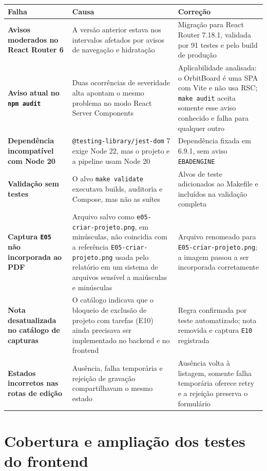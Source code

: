\documentclass[12pt,a4paper,openany]{report}
\begin{document}
\begin{longtable}{>{\bfseries}p{} p{} p{}}
\toprule
Falha & Causa & Correção \\
\midrule
\endhead
Avisos moderados no React Router 6 & A versão anterior estava nos intervalos afetados por avisos de navegação e hidratação & Migração para React Router 7.18.1, validada por 91 testes e pelo build de produção \\
Aviso atual no \texttt{npm audit} & Duas ocorrências de severidade alta apontam o mesmo problema no modo React Server Components & Aplicabilidade analisada: o OrbitBoard é uma SPA com Vite e não usa RSC; \texttt{make audit} aceita somente esse aviso conhecido e falha para qualquer outro \\
Dependência incompatível com Node 20 & \texttt{@testing-library/jest-dom} 7 exige Node 22, mas o projeto e a pipeline usam Node 20 & Dependência fixada em 6.9.1, sem aviso \texttt{EBADENGINE} \\
Validação sem testes & O alvo \texttt{make validate} executava builds, auditoria e Compose, mas não as suítes & Alvos de teste adicionados ao Makefile e incluídos na validação completa \\
Captura \texttt{E05} não incorporada ao PDF & Arquivo salvo como \texttt{e05-criar-projeto.png}, em minúsculas, não coincidia com a referência \texttt{E05-criar-projeto.png} usada pelo relatório em um sistema de arquivos sensível a maiúsculas e minúsculas & Arquivo renomeado para \texttt{E05-criar-projeto.png}; a imagem passou a ser incorporada corretamente \\
Nota desatualizada no catálogo de capturas & O catálogo indicava que o bloqueio de exclusão de projeto com tarefas (E10) ainda precisava ser implementado no backend e no frontend & Regra confirmada por teste automatizado; nota removida e captura \texttt{E10} registrada \\
Estados incorretos nas rotas de edição & Ausência, falha temporária e rejeição de gravação compartilhavam o mesmo estado & Ausência volta à listagem, somente falha temporária oferece retry e a rejeição preserva o formulário \\
\bottomrule
\end{longtable}


\section{Cobertura e ampliação dos testes do frontend}
\end{document}
